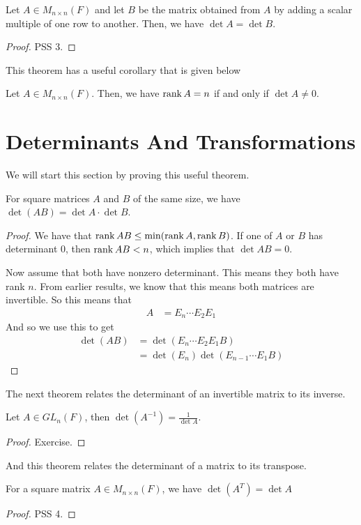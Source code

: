 \documentclass[main.tex]{subfiles}
\begin{document}
    \begin{thrm}{}{}
        Let $A \in M_{n\times n}(F)$ and let $B$ be the matrix obtained from $A$ by adding a scalar multiple of one row to another. Then, we have $\det A = \det B$. 
    \end{thrm}
    \begin{proof}
        PSS 3. 
    \end{proof}
    This theorem has a useful corollary that is given below 
    \begin{cor}{}{}
        Let $A\in M_{n\times n}(F)$. Then, we have $\operatorname{rank} A = n$ if and only if $\det A \neq 0$. 
    \end{cor}

    \section{Determinants And Transformations}

    We will start this section by proving this useful theorem. 
    \begin{thrm}{}{}
        For square matrices $A$ and $B$ of the same size, we have $\det (AB) = \det A \cdot \det B$. 
    \end{thrm}
    \begin{proof}
       We have that $\operatorname{rank} AB \leq \min (\operatorname{rank} A, \operatorname{rank} B)$. If one of $A$ or $B$ has determinant 0, then $\operatorname{rank} AB < n$, which implies that $\det AB = 0$. \par 

       Now assume that both have nonzero determinant. This means they both have rank $n$. From earlier results, we know that this means both matrices are invertible. So this means that 
       \begin{align*}
            A &= E_n \cdots E_2E_1
       \end{align*}
       And so we use this to get 
       \begin{align*}
            \det (AB) &= \det (E_n \cdots E_2E_1 B) \\ 
                      &= \det (E_n) \det (E_{n-1} \cdots E_1B)
       \end{align*}
    \end{proof}

    The next theorem relates the determinant of an invertible matrix to its inverse. 
    \begin{thrm}{}{}
        Let $A\in GL_n(F)$, then $\det \left( A^{-1} \right) = \frac{1}{\det A}$. 
    \end{thrm}
    \begin{proof}
        Exercise. 
    \end{proof}

    And this theorem relates the determinant of a matrix to its transpose. 
    \begin{thrm}{}{}
        For a square matrix $A\in M_{n\times n}(F)$, we have $\det (A^T) = \det A$
    \end{thrm}
    \begin{proof}
        PSS 4. 
    \end{proof}
\end{document}
